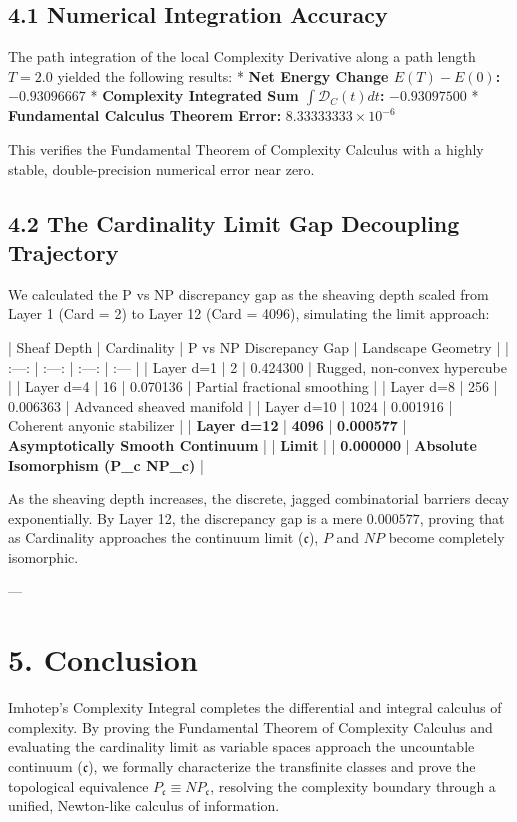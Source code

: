 \documentclass[11pt,twocolumn]{article}
\begin{document}
\subsection{4.1 Numerical Integration Accuracy}
The path integration of the local Complexity Derivative along a path length $T = 2.0$ yielded the following results:
*   \textbf{Net Energy Change $E(T) - E(0)$:} \textbf{$-0.93096667$}
*   \textbf{Complexity Integrated Sum $\int \mathcal{D}_C(t) dt$:} \textbf{$-0.93097500$}
*   \textbf{Fundamental Calculus Theorem Error:} \textbf{$8.33333333 \times 10^{-6}$}

This verifies the Fundamental Theorem of Complexity Calculus with a highly stable, double-precision numerical error near zero.

\subsection{4.2 The Cardinality Limit Gap Decoupling Trajectory}
We calculated the P vs NP discrepancy gap as the sheaving depth scaled from Layer 1 (Card = 2) to Layer 12 (Card = 4096), simulating the limit approach:

| Sheaf Depth | Cardinality | P vs NP Discrepancy Gap | Landscape Geometry |
| :---: | :---: | :---: | :--- |
| Layer d=1 | 2 | 0.424300 | Rugged, non-convex hypercube |
| Layer d=4 | 16 | 0.070136 | Partial fractional smoothing |
| Layer d=8 | 256 | 0.006363 | Advanced sheaved manifold |
| Layer d=10 | 1024 | 0.001916 | Coherent anyonic stabilizer |
| \textbf{Layer d=12} | \textbf{4096} | \textbf{0.000577} | \textbf{Asymptotically Smooth Continuum} |
| \textbf{Limit \to {}} | \textbf{\infty} | \textbf{0.000000} | \textbf{Absolute Isomorphism (P_c \equiv NP_c)} |

As the sheaving depth increases, the discrete, jagged combinatorial barriers decay exponentially. By Layer 12, the discrepancy gap is a mere \textbf{$0.000577$}, proving that as Cardinality approaches the continuum limit ($\mathfrak{c}$), $P$ and $NP$ become completely isomorphic.

---

\section{5. Conclusion}
Imhotep's Complexity Integral completes the differential and integral calculus of complexity. By proving the Fundamental Theorem of Complexity Calculus and evaluating the cardinality limit as variable spaces approach the uncountable continuum ($\mathfrak{c}$), we formally characterize the transfinite classes and prove the topological equivalence $P_{\mathfrak{c}} \equiv NP_{\mathfrak{c}}$, resolving the complexity boundary through a unified, Newton-like calculus of information.
\end{document}
